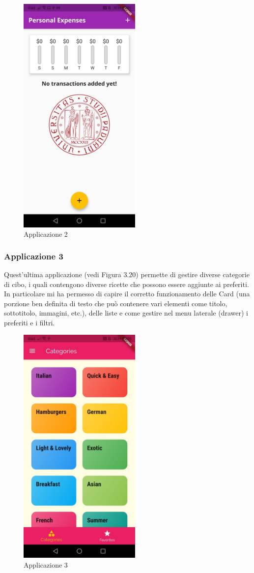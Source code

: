 \begin{figure}[htbp]	
	\centering
	\includegraphics[width=6cm]{immagini/app2.jpeg}
	\caption{Applicazione 2}
	\label{fig:Applicazione 2}
\end{figure}

\newpage

\subsubsection{Applicazione 3}
Quest'ultima applicazione (vedi Figura 3.20) permette di gestire diverse categorie di cibo, i quali contengono diverse ricette che possono essere aggiunte ai preferiti.\\
In particolare mi ha permesso di capire il corretto funzionamento delle Card \cite{card} (una porzione ben definita di testo che può contenere vari elementi come titolo, sottotitolo, immagini, etc.), delle liste e come gestire nel menu laterale (drawer) i preferiti e i filtri.\\

\begin{figure}[htbp]	
	\centering
	\includegraphics[width=6cm]{immagini/app3.jpeg}
	\caption{Applicazione 3}
	\label{fig:Applicazione 3}
\end{figure}






